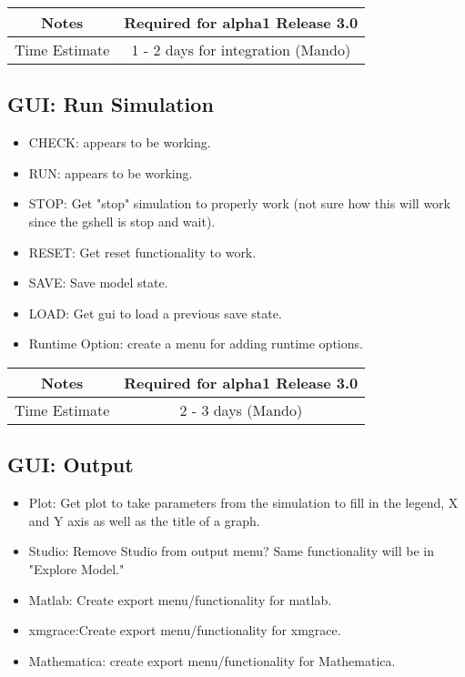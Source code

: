 \documentclass[12pt]{article}
\begin{document}
{
  \vspace{5mm}
  \centering
  \begin{tabular}{|c|c|}
    \hline
    Notes
    & Required for alpha1 Release 3.0 \\
    \hline
    Time Estimate
    & 1 - 2 days for integration (Mando)\\
    \hline
  \end{tabular}
}


\subsection{GUI: Run Simulation}
\begin{itemize}
\item CHECK: appears to be working.
\item RUN: appears to be working.      
\item STOP: Get "stop" simulation to properly work (not sure how this
  will work since the gshell is stop and wait).
\item RESET: Get reset functionality to work.
\item SAVE: Save model state.
\item LOAD: Get gui to load a previous save state.
\item Runtime Option: create a menu for adding runtime options.
\end{itemize}

{
  \vspace{5mm}
  \centering
  \begin{tabular}{|c|c|}
    \hline
    Notes
    & Required for alpha1 Release 3.0 \\
    \hline
    Time Estimate
    & 2 - 3 days (Mando) \\
    \hline
  \end{tabular}
}


\subsection{GUI: Output}
\begin{itemize}
\item Plot: Get plot to take parameters from the simulation to fill in
  the legend, X and Y axis as well as the title of a graph.
\item Studio: Remove Studio from output menu? Same functionality will be in "Explore Model."
\item Matlab: Create export menu/functionality for matlab.
\item xmgrace:Create export menu/functionality for xmgrace.
\item Mathematica: create export menu/functionality for Mathematica.
\end{itemize}
\end{document}
